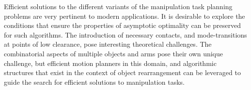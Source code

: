 Efficient solutions to the different variants of the manipulation task planning problems are very pertinent to modern applications. It is desirable to explore the conditions that ensure the properties of asymptotic optimality can be preserved for such algorithms. The introduction of necessary contacts, and mode-transitions at points of low clearance, pose interesting theoretical challenges. The combinatorial aspects of multiple objects and arms pose their own unique challenge, but efficient motion planners in this domain, and algorithmic structures that exist in the context of object rearrangement can be leveraged to guide the search for efficient solutions to manipulation tasks.